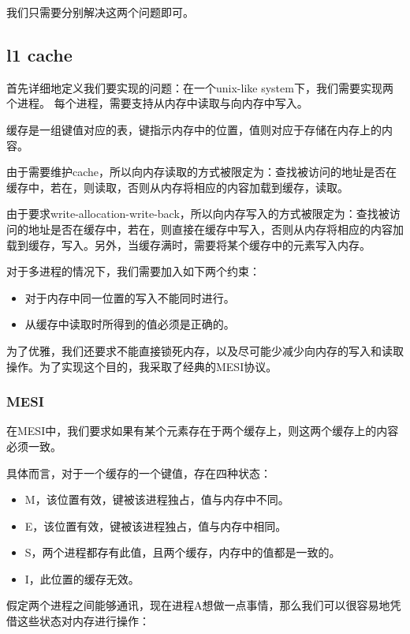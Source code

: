 \documentclass{article}
\theoremstyle{plain} \newtheorem{theorem}{常识}[section]
\theoremstyle{plain} \newtheorem{lizi}{例}[section]
\begin{document}
我们只需要分别解决这两个问题即可。

\subsection{l1 cache}
首先详细地定义我们要实现的问题：在一个unix-like system下，我们需要实现两个进程。
每个进程，需要支持从内存中读取与向内存中写入。

缓存是一组键值对应的表，键指示内存中的位置，值则对应于存储在内存上的内容。

由于需要维护cache，所以向内存读取的方式被限定为：查找被访问的地址是否在缓存中，若在，则读取，否则从内存将相应的内容加载到缓存，读取。

由于要求write-allocation-write-back，所以向内存写入的方式被限定为：查找被访问的地址是否在缓存中，若在，则直接在缓存中写入，否则从内存将相应的内容加载到缓存，写入。另外，当缓存满时，需要将某个缓存中的元素写入内存。

对于多进程的情况下，我们需要加入如下两个约束：

\begin{itemize}
    \item 对于内存中同一位置的写入不能同时进行。
    \item 从缓存中读取时所得到的值必须是正确的。
\end{itemize}

为了优雅，我们还要求不能直接锁死内存，以及尽可能少减少向内存的写入和读取操作。为了实现这个目的，我采取了经典的MESI协议。

\subsubsection{MESI}
在MESI中，我们要求如果有某个元素存在于两个缓存上，则这两个缓存上的内容必须一致。

具体而言，对于一个缓存的一个键值，存在四种状态：

\begin{itemize}
    \item M，该位置有效，键被该进程独占，值与内存中不同。
    \item E，该位置有效，键被该进程独占，值与内存中相同。
    \item S，两个进程都存有此值，且两个缓存，内存中的值都是一致的。
    \item I，此位置的缓存无效。
\end{itemize}

假定两个进程之间能够通讯，现在进程A想做一点事情，那么我们可以很容易地凭借这些状态对内存进行操作：
\end{document}

